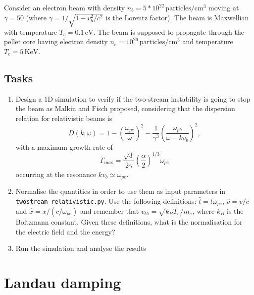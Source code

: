 \documentclass[]{exam}
\begin{document}
Consider an electron beam with density $n_b = 5*10^{22} \, \text{particles}/\text{cm}^3$ moving at $\gamma=50$ (where $\gamma=1/\sqrt{1-v_b^2/c^2}$ is the Lorentz factor). The beam is Maxwellian with temperature $T_b = 0.1 \, \text{eV}$. The beam is supposed to propagate through the pellet core having electron density $n_e =  10^{26} \, \text{particles}/\text{cm}^3$ and temperature $T_e=5 \, \text{KeV}$.

\subsection{Tasks}

\begin{enumerate}
\item Design a 1D simulation to verify if the two-stream instability is going to stop the beam as Malkin and Fisch proposed, considering that the dispersion relation for relativistic beams is
\begin{equation}
D(k,\omega) = 1-\left(\frac{\omega_{pe}}{\omega}\right)^2-\frac{1}{\gamma^3}\left(\frac{\omega_{pb}}{\omega-kv_b}\right)^2 ,
\end{equation}
with a maximum growth rate of
\begin{equation}
\Gamma_{\text{max}}=\frac{\sqrt{3}}{2 \gamma}\left(\frac{\alpha}{2}\right)^{1/3}\omega_{pe}
\end{equation}
occurring at the resonance $kv_b \simeq \omega_{pe}$.

\item Normalise the quantities in order to use them as input parameters in \texttt{twostream_relativistic.py}. Use the following definitions: $\hat{t}=t\omega_{pe}$, $\hat{v}=v/c$ and $\hat{x}=x/(c/\omega_{pe})$ and remember that $v_{th} = \sqrt{k_B T_e/m_e}$, where $k_B$ is the Boltzmann constant. Given these definitions, what is the normalisation for the electric field and the energy?

\item Run the simulation and analyse the results

\end{enumerate}

\section{Landau damping}
\end{document}
